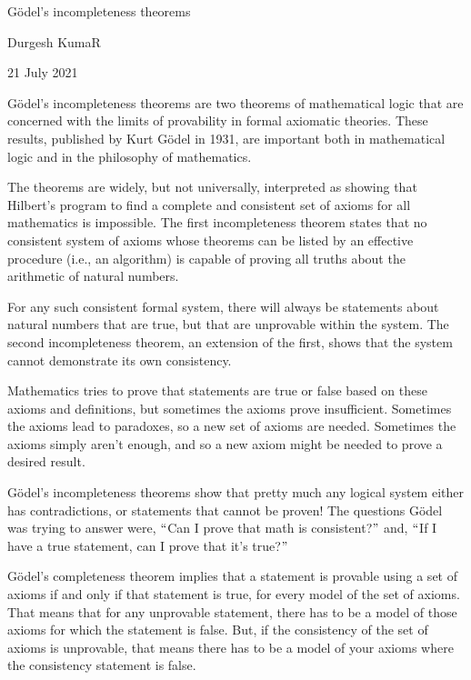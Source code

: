 \documentclass[11pt]{article}
\begin{document}
\begin{center}
{\huge Gödel's incompleteness theorems}
\end{center}


\begin{center}
{\large Durgesh KumaR}
\end{center}


\begin{center}
{\large 21 July 2021}
\end{center}


{\Large Gödel's incompleteness theorems are two theorems of mathematical logic that are concerned with the limits of provability in formal axiomatic theories. These results, published by Kurt Gödel in 1931, are important both in mathematical logic and in the philosophy of mathematics.\par}

{\Large  The theorems are widely, but not universally, interpreted as showing that Hilbert's program to find a complete and consistent set of axioms for all mathematics is impossible. The first incompleteness theorem states that no consistent system of axioms whose theorems can be listed by an effective procedure (i.e., an algorithm) is capable of proving all truths about the arithmetic of natural numbers.\par}

{\Large  For any such consistent formal system, there will always be statements about natural numbers that are true, but that are unprovable within the system. The second incompleteness theorem, an extension of the first, shows that the system cannot demonstrate its own consistency. \par}

{\Large Mathematics tries to prove that statements are true or false based on these axioms and definitions, but sometimes the axioms prove insufficient. Sometimes the axioms lead to paradoxes, so a new set of axioms are needed. Sometimes the axioms simply aren’t enough, and so a new axiom might be needed to prove a desired result.\par}

{\Large  Gödel’s incompleteness theorems show that pretty much any logical system either has contradictions, or statements that cannot be proven! The questions Gödel was trying to answer were, $``$Can I prove that math is consistent?$"$ and, $``$If I have a true statement, can I prove that it’s true?$"$\par}

{\Large Gödel’s completeness theorem implies that a statement is provable using a set of axioms if and only if that statement is true, for every model of the set of axioms. That means that for any unprovable statement, there has to be a model of those axioms for which the statement is false. But, if the consistency of the set of axioms is unprovable, that means there has to be a model of your axioms where the consistency statement is false.\par}
\end{document}
